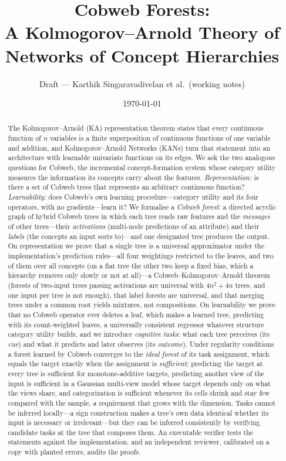 \documentclass[11pt]{article}
\title{Cobweb Forests:\\ A Kolmogorov--Arnold Theory of Networks of Concept Hierarchies}
\author{Draft --- Karthik Singaravadivelan et al.\ (working notes)}
\date{\today}
\theoremstyle{definition}
\theoremstyle{remark}
\begin{document}
\maketitle

\begin{abstract}
The Kolmogorov--Arnold (KA) representation theorem states that every continuous
function of $n$ variables is a finite superposition of continuous functions of one
variable and addition, and Kolmogorov--Arnold Networks (KANs) turn that statement into
an architecture with learnable univariate functions on its edges.  We ask the two
analogous questions for Cobweb, the incremental concept-formation system whose
category utility measures the information its concepts carry about the features.
\emph{Representation:} is there a set of Cobweb trees that represents an arbitrary
continuous function?  \emph{Learnability:} does Cobweb's own learning
procedure---category utility and its four operators, with no gradients---learn it?
We formalise a \emph{Cobweb forest}: a directed acyclic graph of hybrid Cobweb trees in
which each tree reads raw features and the \emph{messages} of other trees---their
\emph{activations} (multi-node predictions of an attribute) and their \emph{labels}
(the concepts an input sorts to)---and one designated tree produces the output.
On representation we prove that a single tree is a universal approximator under the
implementation's prediction rules---all four weightings restricted to the leaves, and two
of them over all concepts (on a flat tree the other two keep a fixed bias, which a
hierarchy removes only slowly or not at all)---a
Cobweb--Kolmogorov--Arnold theorem (forests of two-input trees passing activations are
universal with $4n^2+4n$ trees, and one input per tree is not enough), that label forests
are universal, and that merging trees under a common root yields mixtures, not
compositions.  On learnability we prove that no Cobweb operator ever deletes a leaf,
which makes a learned tree, predicting with its count-weighted leaves, a universally
consistent regressor whatever structure category utility builds, and we introduce \emph{cognitive tasks}: what each tree
perceives (its \emph{cue}) and what it predicts and later observes (its
\emph{outcome}).  Under regularity conditions a forest learned by Cobweb converges to the
\emph{ideal forest} of its task assignment, which equals the target exactly when the assignment is
\emph{sufficient}; predicting the target at every tree is sufficient for
monotone-additive targets, predicting another view of the input is sufficient in a
Gaussian multi-view model whose target depends only on what the views share, and
categorization is sufficient whenever its cells shrink and stay few compared with the
sample, a requirement that grows with the dimension.  Tasks cannot be inferred locally---a sign construction makes a tree's
own data identical whether its input is necessary or irrelevant---but they can be
inferred consistently by verifying candidate tasks at the tree that composes them.  An
executable verifier tests the statements against the implementation, and an independent
reviewer, calibrated on a copy with planted errors, audits the proofs.
\end{abstract}
\end{document}
